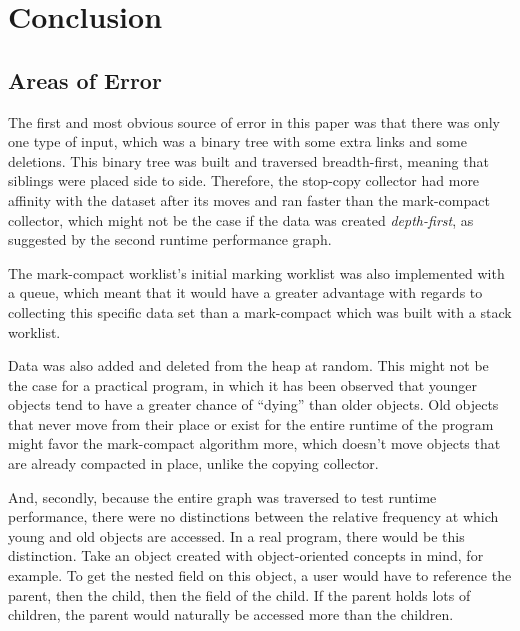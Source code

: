 \documentclass[index]{subfiles}
\begin{document}
\section{Conclusion}

\subsection{Areas of Error}

The first and most obvious source of error in this paper was that there was only one type of input, which was a binary tree with some extra links and some deletions. This binary tree was built and traversed breadth-first, meaning that siblings were placed side to side. Therefore, the stop-copy collector had more affinity with the dataset after its moves and ran faster than the mark-compact collector, which might not be the case if the data was created \textit{depth-first}, as suggested by the second runtime performance graph.

The mark-compact worklist's initial marking worklist was also implemented with a queue, which meant that it would have a greater advantage with regards to collecting this specific data set than a mark-compact which was built with a stack worklist.

Data was also added and deleted from the heap at random. This might not be the case for a practical program, in which it has been observed that younger objects tend to have a greater chance of ``dying'' than older objects\cite{youtube_introductory_video}. Old objects that never move from their place or exist for the entire runtime of the program might favor the mark-compact algorithm more, which doesn't move objects that are already compacted in place, unlike the copying collector.

And, secondly, because the entire graph was traversed to test runtime performance, there were no distinctions between the relative frequency at which young and old objects are accessed. In a real program, there would be this distinction. Take an object created with object-oriented concepts in mind, for example. To get the nested field on this object, a user would have to reference the parent, then the child, then the field of the child. If the parent holds lots of children, the parent would naturally be accessed more than the children.

\end{document}
